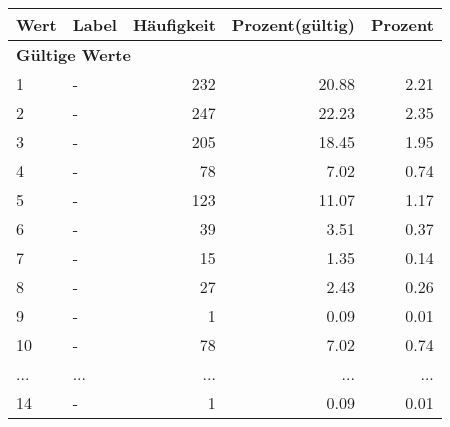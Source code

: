      \begin{longtable}{lXrrr}
     \toprule
     \textbf{Wert} & \textbf{Label} & \textbf{Häufigkeit} & \textbf{Prozent(gültig)} & \textbf{Prozent} \\
     \endhead
     \midrule
     \multicolumn{5}{l}{\textbf{Gültige Werte}}\\
        1 & \multicolumn{1}{X}{-} & %
          \num{232} &
          \num[round-mode=places,round-precision=2]{20,88} &
          \num[round-mode=places,round-precision=2]{2,21} \\
        2 & \multicolumn{1}{X}{-} & %
          \num{247} &
          \num[round-mode=places,round-precision=2]{22,23} &
          \num[round-mode=places,round-precision=2]{2,35} \\
        3 & \multicolumn{1}{X}{-} & %
          \num{205} &
          \num[round-mode=places,round-precision=2]{18,45} &
          \num[round-mode=places,round-precision=2]{1,95} \\
        4 & \multicolumn{1}{X}{-} & %
          \num{78} &
          \num[round-mode=places,round-precision=2]{7,02} &
          \num[round-mode=places,round-precision=2]{0,74} \\
        5 & \multicolumn{1}{X}{-} & %
          \num{123} &
          \num[round-mode=places,round-precision=2]{11,07} &
          \num[round-mode=places,round-precision=2]{1,17} \\
        6 & \multicolumn{1}{X}{-} & %
          \num{39} &
          \num[round-mode=places,round-precision=2]{3,51} &
          \num[round-mode=places,round-precision=2]{0,37} \\
        7 & \multicolumn{1}{X}{-} & %
          \num{15} &
          \num[round-mode=places,round-precision=2]{1,35} &
          \num[round-mode=places,round-precision=2]{0,14} \\
        8 & \multicolumn{1}{X}{-} & %
          \num{27} &
          \num[round-mode=places,round-precision=2]{2,43} &
          \num[round-mode=places,round-precision=2]{0,26} \\
        9 & \multicolumn{1}{X}{-} & %
          \num{1} &
          \num[round-mode=places,round-precision=2]{0,09} &
          \num[round-mode=places,round-precision=2]{0,01} \\
        10 & \multicolumn{1}{X}{-} & %
          \num{78} &
          \num[round-mode=places,round-precision=2]{7,02} &
          \num[round-mode=places,round-precision=2]{0,74} \\
       ... & ... & ... & ... & ... \\
        14 & \multicolumn{1}{X}{-} & %
          \num{1} &
          \num[round-mode=places,round-precision=2]{0,09} &
          \num[round-mode=places,round-precision=2]{0,01} \\


\end{longtable}
